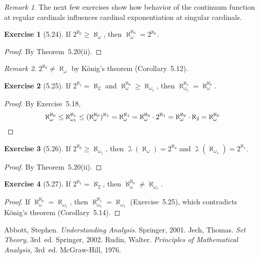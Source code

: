 \documentclass[letterpaper,12pt]{article}
\newcommand{\al}{\aleph}
\newcommand{\alo}{\al_{\omega}}
\newcommand{\aloo}{\al_{\omega_1}}
\newcommand{\mult}{\cdot}
\theoremstyle{definition}
\newtheorem*{exer}{Exercise}
\theoremstyle{remark}
\newtheorem*{rmk}{Remark}
\begin{document}
\begin{rmk}
The next few exercises show how behavior of the continuum function at regular cardinals influences cardinal exponentiation at singular cardinals.
\end{rmk}

\begin{exer}[5.24]
If \(2^{\al_0}\ge\alo\), then \(\alo^{\al_0}=2^{\al_0}\).
\end{exer}
\begin{proof}
By Theorem~5.20(ii).
\end{proof}
\begin{rmk}
\(2^{\al_0}\ne\alo\) by K\"onig's theorem (Corollary~5.12).
\end{rmk}

\begin{exer}[5.25]
If \(2^{\al_1}=\al_2\) and \(\alo^{\al_0}\ge\aloo\), then \(\aloo^{\al_1}=\alo^{\al_0}\).
\end{exer}
\begin{proof}
By Exercise~5.18,
\[\alo^{\al_0}\le\aloo^{\al_1}\le(\alo^{\al_0})^{\al_1}=\alo^{\al_1}=\alo^{\al_0}\mult 2^{\al_1}=\alo^{\al_0}\mult\aleph_2=\alo^{\al_0}\qedhere\]
\end{proof}

\begin{exer}[5.26]
If \(2^{\al_0}\ge\aloo\), then \(\gimel(\alo)=2^{\al_0}\) and \(\gimel(\aloo)=2^{\al_1}\).
\end{exer}
\begin{proof}
By Theorem~5.20(ii).
\end{proof}

\begin{exer}[5.27]
If \(2^{\al_1}=\al_2\), then \(\alo^{\al_0}\ne\aloo\).
\end{exer}
\begin{proof}
If \(\alo^{\al_0}=\aloo\), then \(\aloo^{\al_1}=\aloo\) (Exercise~5.25), which contradicts K\"onig's theorem (Corollary~5.14).
\end{proof}

\begin{thebibliography}{0}
 Abbott, Stephen. \textit{Understanding Analysis}. Springer, 2001.
 Jech, Thomas. \textit{Set Theory}, 3rd~ed. Springer, 2002.
 Rudin, Walter. \textit{Principles of Mathematical Analysis}, 3rd~ed. McGraw-Hill, 1976.
\end{thebibliography}
\end{document}

